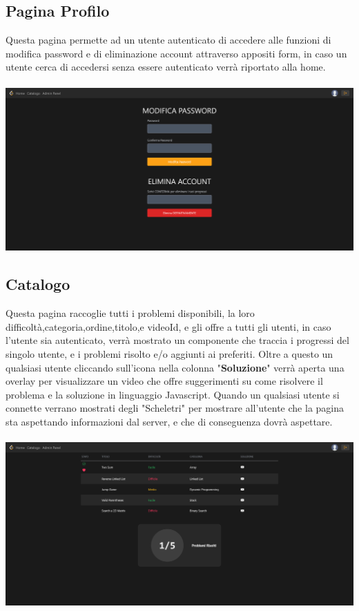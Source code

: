 \documentclass[11pt, a4paper]{article}
\theoremstyle{definition}
\begin{document}
\subsection{Pagina Profilo}
Questa pagina permette ad un utente autenticato di accedere alle funzioni di modifica password e di eliminazione account attraverso appositi form, in caso un utente cerca di accedersi senza essere autenticato verrà riportato alla home.\\\\
\includegraphics[width=\textwidth]{materiale/sito/Pagina Profilo.png}
\newpage
\subsection{Catalogo}
Questa pagina raccoglie tutti i problemi disponibili, la loro difficoltà,categoria,ordine,titolo,e videoId, e gli offre a tutti gli utenti, in caso l'utente sia autenticato, verrà mostrato un componente che traccia i progressi del singolo utente, e i problemi risolto e/o aggiunti ai preferiti. Oltre a questo un qualsiasi
utente cliccando sull'icona nella colonna "\textbf{Soluzione}" verrà aperta una overlay per visualizzare un video che offre suggerimenti su come risolvere il problema e la soluzione in linguaggio Javascript.
Quando un qualsiasi utente si connette verrano mostrati degli "Scheletri" per mostrare all'utente che la pagina sta aspettando informazioni dal server, e che di conseguenza dovrà aspettare.\\\\
\includegraphics[width=\textwidth]{materiale/sito/Catalogo.png}
\newpage
\end{document}
